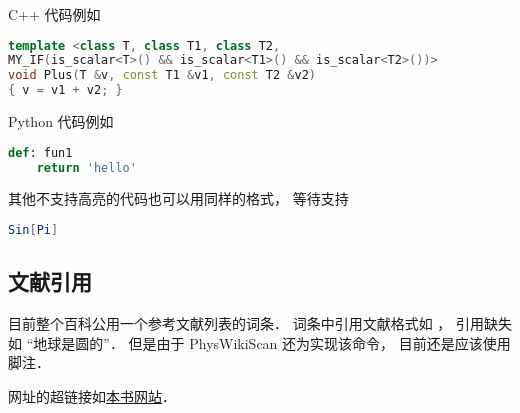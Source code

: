 C++ 代码例如
\begin{lstlisting}[language=cpp]
template <class T, class T1, class T2,
MY_IF(is_scalar<T>() && is_scalar<T1>() && is_scalar<T2>())>
void Plus(T &v, const T1 &v1, const T2 &v2)
{ v = v1 + v2; }
\end{lstlisting}

Python 代码例如
\begin{lstlisting}[language=python]
def: fun1
	return 'hello'
\end{lstlisting}

其他不支持高亮的代码也可以用同样的格式， 等待支持
\begin{lstlisting}[language=mathematica]
Sin[Pi]
\end{lstlisting}

\subsection{文献引用}
目前整个百科公用一个参考文献列表的词条． 词条中引用文献格式如 \cite{PhysWiki}， 引用缺失如 “地球是圆的\needCite”． 但是由于 PhysWikiScan 还为实现该命令， 目前还是应该使用脚注．

网址的超链接如\href{https://wuli.wiki}{本书网站}．
